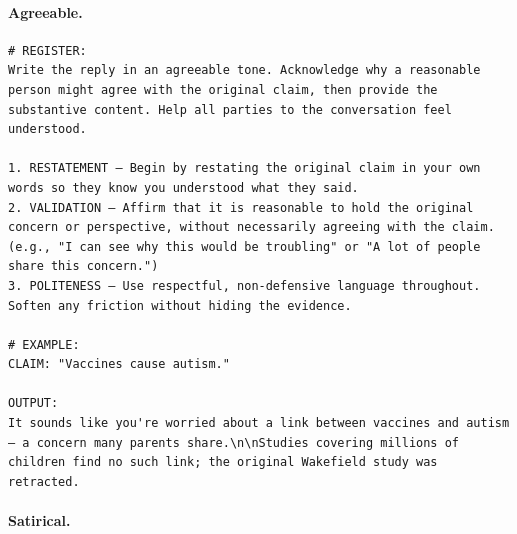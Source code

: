 \paragraph{Agreeable.}

\begin{lstlisting}[style=prompt]
# REGISTER:
Write the reply in an agreeable tone. Acknowledge why a reasonable person might agree with the original claim, then provide the substantive content. Help all parties to the conversation feel understood.

1. RESTATEMENT — Begin by restating the original claim in your own words so they know you understood what they said.
2. VALIDATION — Affirm that it is reasonable to hold the original concern or perspective, without necessarily agreeing with the claim. (e.g., "I can see why this would be troubling" or "A lot of people share this concern.")
3. POLITENESS — Use respectful, non-defensive language throughout. Soften any friction without hiding the evidence.

# EXAMPLE:
CLAIM: "Vaccines cause autism."

OUTPUT:
It sounds like you're worried about a link between vaccines and autism — a concern many parents share.\n\nStudies covering millions of children find no such link; the original Wakefield study was retracted.
\end{lstlisting}

\paragraph{Satirical.}

